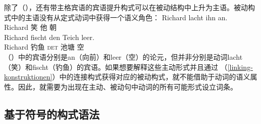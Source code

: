 除了（），还有带主格宾语的宾语提升构式可以在被动结构中上升为主语。被动构式中的主语没有从定式动词中获得一个语义角色：
\eal
\ex
\gll Richard lacht ihn an.\\
     Richard 笑 他 朝\\
\ex
\gll Richard fischt den Teich leer.\\
     Richard 钓鱼 \textsc{det} 池塘 空\\
\zl
 （）中的宾语分别是an（向前）和leer（空）的论元，但并非分别是动词lacht（笑）和fischt（钓鱼）的宾语。如果想要解释这些主动形式并且通过 （\ref{linking-konstruktionen}）中的连接构式获得对应的被动构式，就不能借助于动词的语义属性。因此，就需要为出现在主动、被动句中动词的所有可能形式设立词条。

\subsection{基于符号的构式语法}
\label{sec-SbCxG}\label{sec-sbcg}\label{sec-SBCG}

